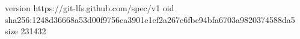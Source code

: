version https://git-lfs.github.com/spec/v1
oid sha256:1248d36668a53d00f9756ca3901e1ef2a267e6fbe94bfa6703a9820374588da5
size 231432
